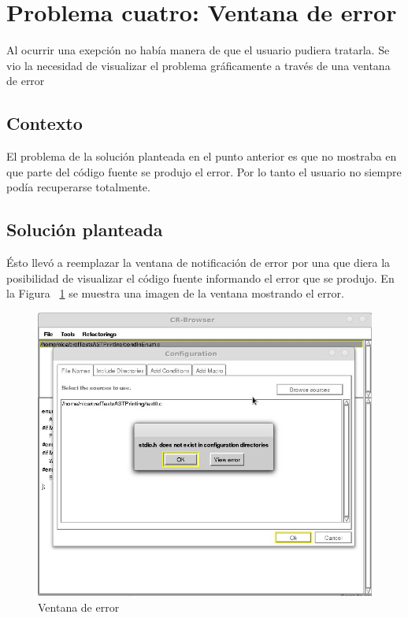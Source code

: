 \documentclass[a4paper,oneside,12pt]{article}
\begin{document}
\section{Problema cuatro: Ventana de error}

Al ocurrir una exepci\'on no hab\'ia manera de que el usuario pudiera tratarla. Se vio la necesidad de visualizar el problema gr\'aficamente a trav\'es de una ventana de error

\subsection{Contexto}
El problema de la soluci\'on planteada en el punto anterior es que no mostraba en que parte del c\'odigo fuente se produjo el error. Por lo tanto el usuario no siempre pod\'ia recuperarse totalmente.

\subsection{Soluci\'on planteada}
\'Esto llev\'o a reemplazar la ventana de notificaci\'on de error por una que diera la posibilidad de visualizar el c\'odigo fuente informando el error que se produjo. En la Figura ~\ref{ventana_de_error} se muestra una imagen de la ventana mostrando el error.

\begin{figure}[h!]
  \centering
    \includegraphics[scale=0.50]{images/codigo_modificado/error_header_no_encontrado.jpg}
     \caption{Ventana de error}
     \label{ventana_de_error}
\end{figure}
\end{document}
